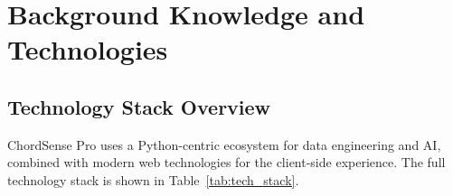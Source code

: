 \documentclass[a4paper]{article}
\begin{document}
\newpage
\section{Background Knowledge and Technologies}

\subsection{Technology Stack Overview}

ChordSense Pro uses a Python-centric ecosystem for data engineering and AI, combined with modern web technologies for the client-side experience. The full technology stack is shown in Table~\ref{tab:tech_stack}.
\end{document}
